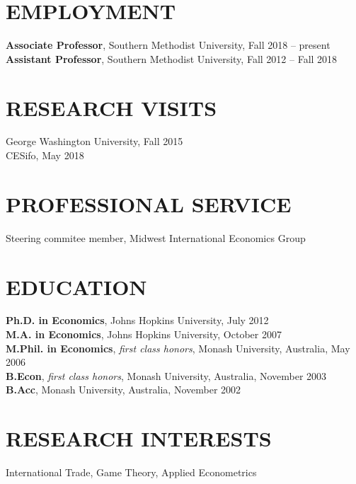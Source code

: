 \documentclass[11pt]{res}
\begin{document}
\begin{resume}
\hspace{-0.5in}\makebox[6.1in]{\hrulefill}

\section{EMPLOYMENT} \vspace{1.5mm}
{\bf Associate Professor}, Southern Methodist University, Fall 2018 -- present
{\bf Assistant Professor}, Southern Methodist University, Fall 2012 -- Fall 2018

\section{RESEARCH VISITS} \vspace{1.5mm}
George Washington University, Fall 2015\vspace{1.5mm}\\
CESifo, May 2018

\section{PROFESSIONAL SERVICE} \vspace{1.5mm}
Steering commitee member, Midwest International Economics Group

\section{EDUCATION} \vspace{1.5mm}
    {\bf Ph.D. in Economics}, Johns Hopkins University, July 2012 \vspace{1.5mm}\\
    {\bf M.A. in Economics}, Johns Hopkins University, October 2007\vspace{1.5mm}\\
    {\bf M.Phil. in Economics}, \emph{first class honors}, Monash University, Australia, May 2006\vspace{1.5mm}\\
    {\bf B.Econ}, \emph{first class honors}, Monash University, Australia, November 2003\vspace{1.5mm}\\
    {\bf B.Acc}, Monash University, Australia, November 2002


\section{RESEARCH INTERESTS}\vspace{1.5mm}
International Trade, Game Theory, Applied Econometrics


\end{resume}
\end{document}
